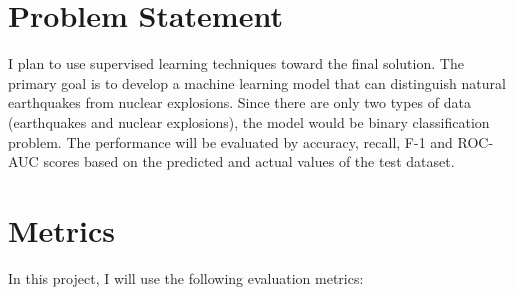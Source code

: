 \documentclass[12pt]{article}
\begin{document}
        \section{Problem Statement}
        I plan to use supervised learning techniques toward the final solution. The primary goal is to develop a machine learning model that can distinguish natural earthquakes from nuclear explosions. Since there are only two types of data (earthquakes and nuclear explosions), the model would be binary classification problem. The performance will be evaluated by accuracy, recall, F-1 and ROC-AUC scores based on the predicted and actual values of the test dataset.
    
    
        \section{Metrics}
        In this project, I will use the following evaluation metrics:  
        
\end{document}
